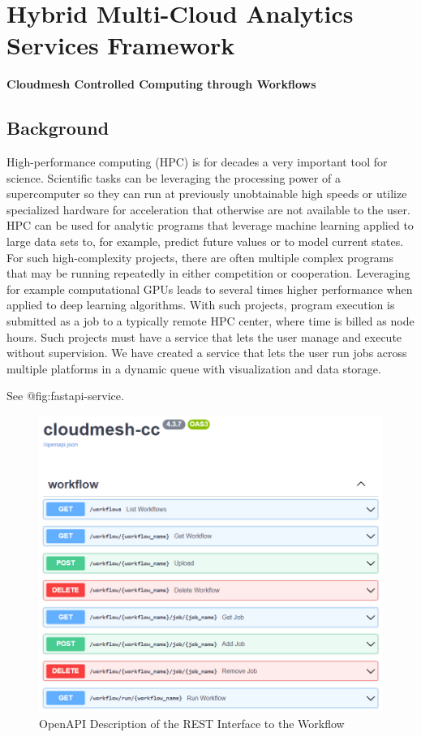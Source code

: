 \section{Hybrid Multi-Cloud Analytics Services
Framework}\label{hybrid-multi-cloud-analytics-services-framework}

\textbf{Cloudmesh Controlled Computing through Workflows}


\subsection{Background}\label{background}

High-performance computing (HPC) is for decades a very important tool
for science. Scientific tasks can be leveraging the processing power of
a supercomputer so they can run at previously unobtainable high speeds
or utilize specialized hardware for acceleration that otherwise are not
available to the user. HPC can be used for analytic programs that
leverage machine learning applied to large data sets to, for example,
predict future values or to model current states. For such
high-complexity projects, there are often multiple complex programs that
may be running repeatedly in either competition or cooperation.
Leveraging for example computational GPUs leads to several times higher
performance when applied to deep learning algorithms. With such
projects, program execution is submitted as a job to a typically remote
HPC center, where time is billed as node hours. Such projects must have
a service that lets the user manage and execute without supervision. We
have created a service that lets the user run jobs across multiple
platforms in a dynamic queue with visualization and data storage.

See @fig:fastapi-service.

\begin{figure}
\centering
\includegraphics[width=1.0\columnwidth]{images/fastapi-service.png}
\caption{OpenAPI Description of the REST Interface to the
Workflow}\label{fig:fastapi-service}
\end{figure}

